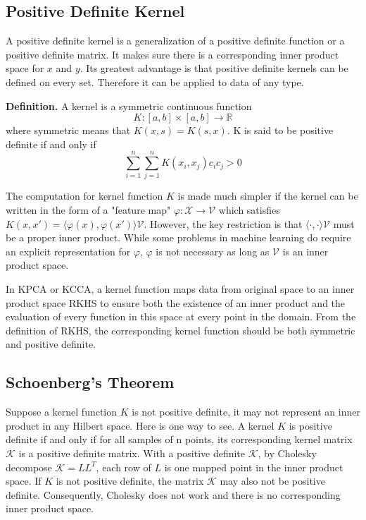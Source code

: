 \documentclass[12pt]{report} %
\begin{document}
\subsection{Positive Definite Kernel}
A positive definite kernel is a generalization of a positive definite function or a positive definite matrix. It makes sure there is a corresponding inner product space for $x$ and $y$. Its greatest advantage is that positive definite kernels can be defined on every set. Therefore it can be applied to data of any type.

\textbf{Definition.}\cite{PD} A kernel is a symmetric continuous function
\begin{equation}
K:[a,b] \times [a,b] \rightarrow \mathbb {R}
\end{equation}
where symmetric means that \( K(x, s) = K(s, x)\).
K is said to be positive definite if and only if
\begin{equation}
\sum _{i=1}^{n}\sum _{j=1}^{n}K(x_{i},x_{j})c_{i}c_{j} > 0
\end{equation}

The computation for kernel function $K$ is made much simpler if the kernel can be written in the form of a "feature map" $\varphi:\mathcal{X}\to\mathcal{V}$ which satisfies $K(x,x')=\langle \varphi (x), \varphi (x') \rangle \mathcal{V}$. However, the key restriction is that $\langle \cdot, \cdot \rangle \mathcal{V}$ must be a proper inner product. While some problems in machine learning do require an explicit representation for $\varphi$, $\varphi$ is not necessary as long as $\mathcal{V}$ is an inner product space\cite{PD}.

In KPCA or KCCA, a kernel function maps data from original space to an inner product space RKHS to ensure both the existence of an inner product and the evaluation of every function in this space at every point in the domain. From the definition of RKHS, the corresponding kernel function should be both symmetric and positive definite\cite{RKHS}.

\subsection{Schoenberg's Theorem}
Suppose a kernel function $K$ is not positive definite, it may not represent an inner product in any Hilbert space. Here is one way to see. A kernel $K$ is positive definite if and only if for all samples of n points, its corresponding kernel matrix $\mathcal{K}$ is a positive definite matrix. With a positive definite $\mathcal{K}$, by Cholesky decompose $\mathcal{K}=LL^T$, each row of $L$ is one mapped point in the inner product space. If $K$ is not positive definite, the matrix $\mathcal{K}$ may also not be positive definite. Consequently, Cholesky does not work and there is no corresponding inner product space. 
\end{document}

